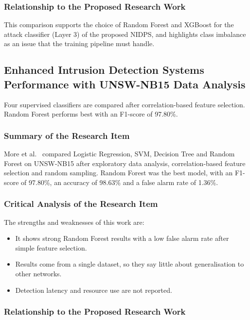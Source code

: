\subsubsection{Relationship to the Proposed Research Work}\label{sec:3.2.12.3}

\noindent This comparison supports the choice of Random Forest and XGBoost for the attack classifier (Layer 3) of the proposed NIDPS, and highlights class imbalance as an issue that the training pipeline must handle.

\subsection{Enhanced Intrusion Detection Systems Performance with UNSW-NB15 Data Analysis}\label{sec:3.2.13}

\noindent Four supervised classifiers are compared after correlation-based feature selection. Random Forest performs best with an F1-score of 97.80\%.

\subsubsection{Summary of the Research Item}\label{sec:3.2.13.1}

\noindent More et al.~\cite{lr:more2024} compared Logistic Regression, SVM, Decision Tree and Random Forest on UNSW-NB15 after exploratory data analysis, correlation-based feature selection and random sampling. Random Forest was the best model, with an F1-score of 97.80\%, an accuracy of 98.63\% and a false alarm rate of 1.36\%.

\subsubsection{Critical Analysis of the Research Item}\label{sec:3.2.13.2}

\noindent The strengths and weaknesses of this work are:

\begin{itemize}
\item It shows strong Random Forest results with a low false alarm rate after simple feature selection.
\item Results come from a single dataset, so they say little about generalisation to other networks.
\item Detection latency and resource use are not reported.
\end{itemize}

\subsubsection{Relationship to the Proposed Research Work}\label{sec:3.2.13.3}


